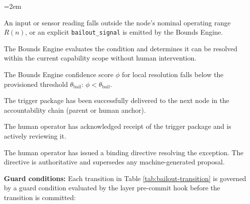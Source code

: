 \begin{trivlist}\itemindent=2em
\item[$E_{\text{anomaly}}$] An input or sensor reading falls outside the
  node's nominal operating range $R(n)$, or an explicit \texttt{bailout\_signal}
  is emitted by the Bounds Engine.

\item[$E_{\text{local\_ok}}$] The Bounds Engine evaluates the condition and
  determines it can be resolved within the current capability scope without
  human intervention.

\item[$E_{\text{bail}}$] The Bounds Engine confidence score $\phi$ for local
  resolution falls below the provisioned threshold $\theta_{\text{bail}}$:
  $\phi < \theta_{\text{bail}}$.

\item[$E_{\text{prop}}$] The trigger package has been successfully delivered
  to the next node in the accountability chain (parent or human anchor).

\item[$E_{\text{ack}}$] The human operator has acknowledged receipt of the
  trigger package and is actively reviewing it.

\item[$E_{\text{directive}}$] The human operator has issued a binding directive
  resolving the exception. The directive is authoritative and supersedes any
  machine-generated proposal.
\end{trivlist}

\bigskip
\noindent\textbf{Guard conditions:} Each transition in Table
\ref{tab:bailout-transition} is governed by a guard condition evaluated by the
\fact{} layer pre-commit hook before the transition is committed:

